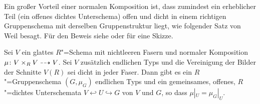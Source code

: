 Ein großer Vorteil einer normalen Komposition ist, dass zumindest
ein erheblicher Teil (ein offenes dichtes Unterschema) offen
und dicht in einem richtigen Gruppenschema mit derselben Gruppenstruktur
liegt, wie folgender Satz von Weil besagt. Für den Beweis siehe
\cite[Theorem~VIII.1.12]{artin} oder \cite[Theorem~IV.6.9]{silverman2}
für eine Skizze.
\begin{Theorem}[Weil]\label{thm:weil}
  Sei $V$ ein glattes $R$"=Schema mit nichtleeren Fasern
  und normaler Komposition $\mu\colon V\times_R V\dashrightarrow V$.
  Sei $V$ zusätzlich endlichen Typs und die Vereinigung der Bilder der
  Schnitte $V(R)$ sei dicht in jeder Faser. 
  Dann gibt es ein $R$"=Gruppenschema $(G,\mu_G)$ endlichen Typs und
  ein gemeinsames, offenes, $R$"=dichtes Unterschemata $V\hookleftarrow
  U\hookrightarrow G$ von $V$ und $G$, so dass $\mu|_U=\mu_G|_U$.
\end{Theorem}

